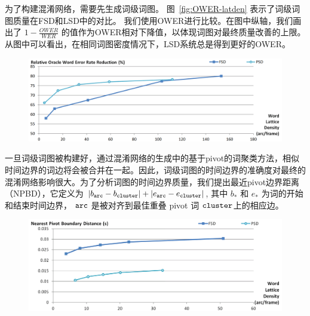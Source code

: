 
为了构建混淆网络，需要先生成词级词图。 图~\ref{fig:OWER-latden} 表示了词级词图质量在FSD和LSD中的对比。
我们使用OWER进行比较。在图中纵轴，我们画出了 $1-\frac{OWER}{WER}$ 的值作为OWER相对下降值，以体现词图对最终质量改善的上限。从图中可以看出，在相同词图密度情况下，LSD系统总是得到更好的OWER。


\begin{figure}[!htp]
  \centering
    \captionstyle{\centering}
    \includegraphics[width=\textwidth]{figure/OWER-latden.png}
\end{figure}

一旦词级词图被构建好，通过混淆网络的生成中的基于pivot的词聚类方法，相似时间边界的词边将会被合并在一起。因此，词级词图的时间边界的准确度对最终的混淆网络影响很大。为了分析词图的时间边界质量，我们提出最近pivot边界距离（NPBD），它定义为 $|b_{\tt arc}-b_{\tt cluster}|+|e_{\tt arc}-e_{\tt cluster}|$, 其中 $b_*$ 和 $e_*$ 为词的开始和结束时间边界， $\tt arc$ 是被对齐到最佳重叠 pivot 词 $\tt cluster$上的相应边。


\begin{figure}[!htp]
  \centering
    \captionstyle{\centering}
    \includegraphics[width=\textwidth]{figure/bound-stable.png}
\end{figure}

